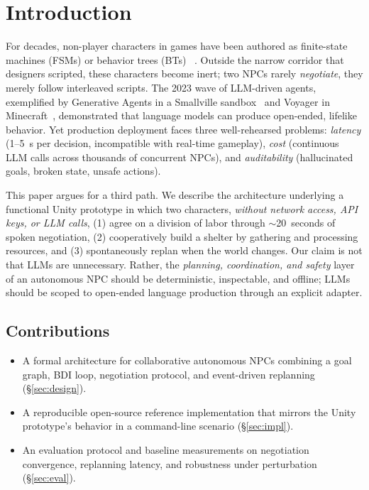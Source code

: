 \documentclass[sigconf, authorversion]{acmart}
\begin{document}

\section{Introduction}
For decades, non-player characters in games have been authored as
finite-state machines (FSMs) or behavior trees (BTs)
~\cite{champandard2007behavior, dawe2008behavior}. Outside the narrow
corridor that designers scripted, these characters become inert; two NPCs
rarely \emph{negotiate}, they merely follow interleaved scripts. The 2023
wave of LLM-driven agents, exemplified by Generative Agents in a Smallville
sandbox~\cite{park2023generative} and Voyager in Minecraft~\cite{wang2023voyager},
demonstrated that language models can produce open-ended, lifelike
behavior. Yet production deployment faces three well-rehearsed problems:
\emph{latency} (1--5~s per decision, incompatible with real-time
gameplay), \emph{cost} (continuous LLM calls across thousands of concurrent
NPCs), and \emph{auditability} (hallucinated goals, broken state, unsafe
actions).

This paper argues for a third path. We describe the architecture
underlying a functional Unity prototype in which two characters,
\emph{without network access, API keys, or LLM calls}, (1) agree on a
division of labor through $\sim$20~seconds of spoken negotiation, (2)
cooperatively build a shelter by gathering and processing resources, and
(3) spontaneously replan when the world changes. Our claim is not that
LLMs are unnecessary. Rather, the \emph{planning, coordination, and
safety} layer of an autonomous NPC should be deterministic, inspectable,
and offline; LLMs should be scoped to open-ended language production
through an explicit adapter.

\subsection{Contributions}
\begin{itemize}
  \item A formal architecture for collaborative autonomous NPCs
        combining a goal graph, BDI loop, negotiation protocol, and
        event-driven replanning (\S\ref{sec:design}).
  \item A reproducible open-source reference implementation that mirrors
        the Unity prototype's behavior in a command-line scenario
        (\S\ref{sec:impl}).
  \item An evaluation protocol and baseline measurements on negotiation
        convergence, replanning latency, and robustness under perturbation
        (\S\ref{sec:eval}).
\end{itemize}
\end{document}
